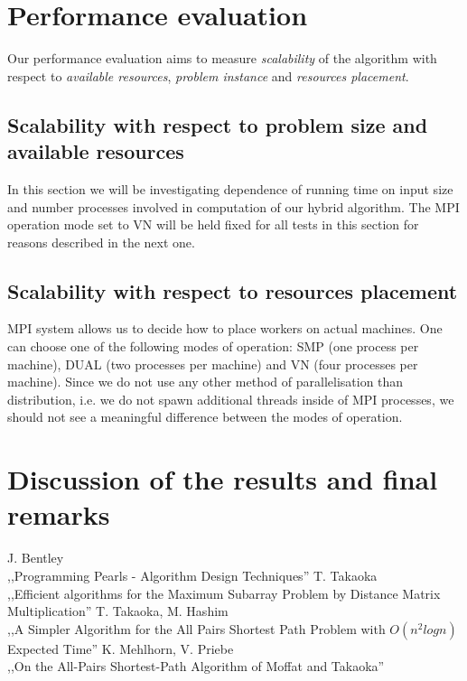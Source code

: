 \section*{Performance evaluation}

Our performance evaluation aims to measure \emph{scalability} of the algorithm with respect to \emph{available resources}, \emph{problem instance} and \emph{resources placement}.

\subsection*{Scalability with respect to problem size and available resources}

In this section we will be investigating dependence of running time on input size and number processes involved in computation of our hybrid algorithm.
The MPI operation mode set to VN will be held fixed for all tests in this section for reasons described in the next one.


\subsection*{Scalability with respect to resources placement}

MPI system allows us to decide how to place workers on actual machines.
One can choose one of the following modes of operation: SMP (one process per machine), DUAL (two processes per machine) and VN (four processes per machine).
Since we do not use any other method of parallelisation than distribution, i.e. we do not spawn additional threads inside of MPI processes, we should not see a meaningful difference between the modes of operation.


\section*{Discussion of the results and final remarks}



\begin{thebibliography}{9}
     J. Bentley \\
        \newblock ,,Programming Pearls - Algorithm Design Techniques''
     T. Takaoka \\
        \newblock ,,Efficient algorithms for the Maximum Subarray Problem by Distance Matrix Multiplication''
     T. Takaoka, M. Hashim \\
        \newblock ,,A Simpler Algorithm for the All Pairs Shortest Path Problem with $O(n^2 log{n})$ Expected Time''
     K. Mehlhorn, V. Priebe \\
        \newblock ,,On the All-Pairs Shortest-Path Algorithm of Moffat and Takaoka''
\end{thebibliography}


